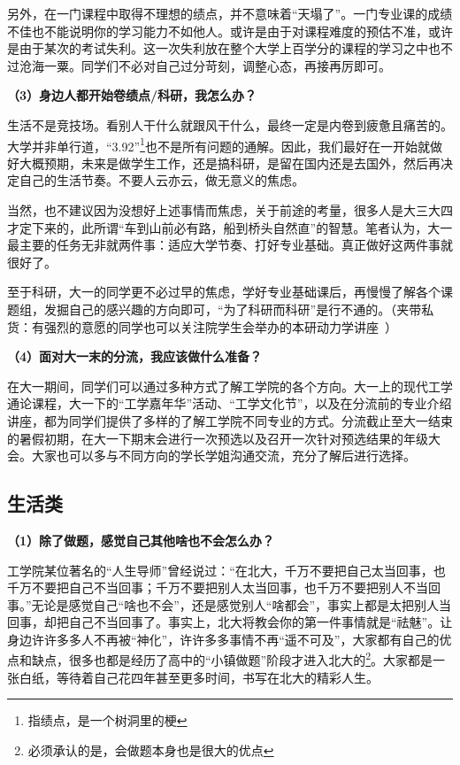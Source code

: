 \vspace{10pt}

另外，在一门课程中取得不理想的绩点，并不意味着“天塌了”。一门专业课的成绩不佳也不能说明你的学习能力不如他人。或许是由于对课程难度的预估不准，或许是由于某次的考试失利。这一次失利放在整个大学上百学分的课程的学习之中也不过沧海一粟。同学们不必对自己过分苛刻，调整心态，再接再厉即可。

\vspace{10pt}

\textbf{（3）身边人都开始卷绩点/科研，我怎么办？}

生活不是竞技场。看别人干什么就跟风干什么，最终一定是内卷到疲惫且痛苦的。大学并非单行道，“3.92”\footnote{指绩点，是一个树洞里的梗}也不是所有问题的通解。因此，我们最好在一开始就做好大概预期，未来是做学生工作，还是搞科研，是留在国内还是去国外，然后再决定自己的生活节奏。不要人云亦云，做无意义的焦虑。

\vspace{10pt}

当然，也不建议因为没想好上述事情而焦虑，关于前途的考量，很多人是大三大四才定下来的，此所谓“车到山前必有路，船到桥头自然直”的智慧。笔者认为，大一最主要的任务无非就两件事：适应大学节奏、打好专业基础。真正做好这两件事就很好了。

\vspace{10pt}

至于科研，大一的同学更不必过早的焦虑，学好专业基础课后，再慢慢了解各个课题组，发掘自己的感兴趣的方向即可，“为了科研而科研”是行不通的。（夹带私货：有强烈的意愿的同学也可以关注院学生会举办的本研动力学讲座~）

\textbf{（4）面对大一末的分流，我应该做什么准备？}

在大一期间，同学们可以通过多种方式了解工学院的各个方向。大一上的现代工学通论课程，大一下的“工学嘉年华”活动、“工学文化节”，以及在分流前的专业介绍讲座，都为同学们提供了多样的了解工学院不同专业的方式。分流截止至大一结束的暑假初期，在大一下期末会进行一次预选以及召开一次针对预选结果的年级大会。大家也可以多与不同方向的学长学姐沟通交流，充分了解后进行选择。

\subsection{生活类}
\textbf{（1）除了做题，感觉自己其他啥也不会怎么办？}

\vspace{10pt}

工学院某位著名的“人生导师”曾经说过：“在北大，千万不要把自己太当回事，也千万不要把自己不当回事；千万不要把别人太当回事，也千万不要把别人不当回事。”无论是感觉自己“啥也不会”，还是感觉别人“啥都会”，事实上都是太把别人当回事，却把自己不当回事了。事实上，北大将教会你的第一件事情就是“祛魅”。让身边许许多多人不再被“神化”，许许多多事情不再“遥不可及”，大家都有自己的优点和缺点，很多也都是经历了高中的“小镇做题”阶段才进入北大的\footnote{必须承认的是，会做题本身也是很大的优点}。大家都是一张白纸，等待着自己花四年甚至更多时间，书写在北大的精彩人生。

